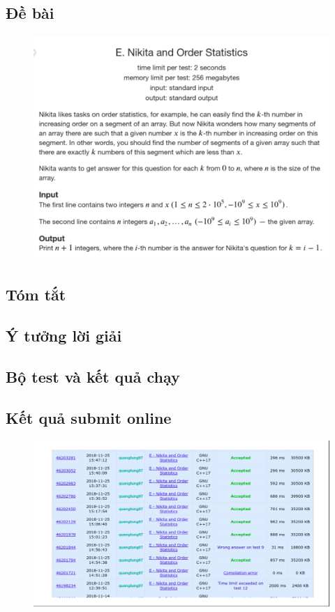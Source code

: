 \documentclass[../report.tex]{subfiles}
\begin{document}
\subsection{Đề bài} \cite{problem-993e}
\begin{figure}[H]
\centering
\includegraphics[width=\textwidth]{figures/993E.png}
\end{figure}

\subsection{Tóm tắt}

\subsection{Ý tưởng lời giải}

\subsection{Bộ test và kết quả chạy} 

\subsection{Kết quả submit online}
\begin{figure}[H]
\centering
\includegraphics[width=\textwidth]{figures/submit-993e.png}
\end{figure}
\end{document}
